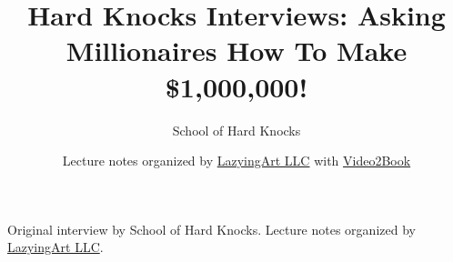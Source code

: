 \documentclass[11pt,oneside]{book}
\begin{document}
\frontmatter
\title{Hard Knocks Interviews: Asking Millionaires How To Make \$1,000,000!}
\author{School of Hard Knocks}
\date{Lecture notes organized by \href{https://lazying.art}{LazyingArt LLC} with \href{https://github.com/lachlanchen/Video2Book}{Video2Book}}
\maketitle
\begin{center}
\small Original interview by School of Hard Knocks. Lecture notes organized by \href{https://lazying.art}{LazyingArt LLC}.
\end{center}
\clearpage
\mainmatter

\end{document}
